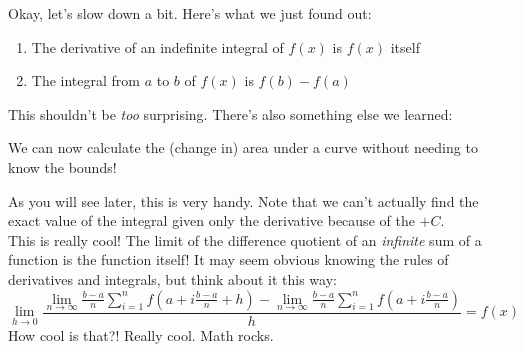 \documentclass[../revisedmain.tex]{subfiles}
\begin{document}
Okay, let's slow down a bit. Here's what we just found out:
\begin{enumerate}
	\item The derivative of an indefinite integral of $f(x)$ is $f(x)$ itself
	\item The integral from $a$ to $b$ of $f(x)$ is $f(b)-f(a)$
\end{enumerate}
This shouldn't be \textit{too} surprising. There's also something else we learned:
\begin{displayquote}
	We can now calculate the (change in) area under a curve without needing to know the bounds!
\end{displayquote}
As you will see later, this is very handy. Note that we can't actually find the exact value of the integral given only the derivative because of the $+C$.\\
This is really cool! The limit of the difference quotient of an \textit{infinite} sum of a function is the function itself! It may seem obvious knowing the rules of derivatives and integrals, but think about it this way:
\[
\lim_{h\to 0}\frac{
	\lim_{n\to\infty}\frac{b-a}{n}\sum_{i=1}^{n} f\left(a+i\frac{b-a}{n}+h\right) - \lim_{n\to\infty}\frac{b-a}{n}\sum_{i=1}^{n} f\left(a+i\frac{b-a}{n}\right) 
}{
h
} = f(x)
\]
How cool is that?! Really cool. Math rocks.
\end{document}
